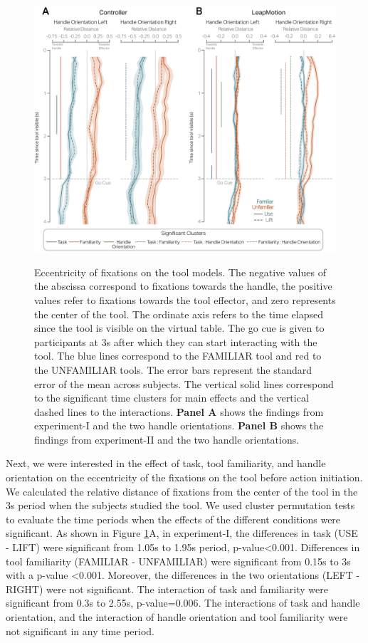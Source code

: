 \begin{figure}[ht]
    \centering
    \includegraphics[width=1\linewidth]{source/figures/result/dev_center_final.png} \\
    \caption[]{Eccentricity of fixations on the tool models. The negative values of the abscissa correspond to fixations towards the handle, the positive values refer to fixations towards the tool effector, and zero represents the center of the tool. The ordinate axis refers to the time elapsed since the tool is visible on the virtual table. The go cue is given to participants at 3s after which they can start interacting with the tool. The blue lines correspond to the FAMILIAR tool and red to the UNFAMILIAR tools. The error bars represent the standard error of the mean across subjects.  The vertical solid lines correspond to the significant time clusters for main effects and the vertical dashed lines to the interactions. \textbf{Panel A} shows the findings from experiment-I and the two handle orientations. \textbf{Panel B} shows the findings from experiment-II and the two handle orientations.
}
    \label{figure:dev_from_center}
\end{figure}

Next, we were interested in the effect of task, tool familiarity, and handle orientation on the eccentricity of the fixations on the tool before action initiation. We calculated the relative distance of fixations from the center of the tool in the 3s period when the subjects studied the tool. We used cluster permutation tests to evaluate the time periods when the effects of the different conditions were significant. As shown in Figure \ref{figure:dev_from_center}A, in experiment-I, the differences in task (USE - LIFT) were significant from 1.05s to 1.95s period, p-value<0.001. Differences in tool familiarity (FAMILIAR - UNFAMILIAR) were significant from 0.15s to 3s with a p-value <0.001. Moreover, the differences in the two orientations (LEFT - RIGHT) were not significant. The interaction of task and familiarity were significant from 0.3s to 2.55s, p-value=0.006. The interactions of task and handle orientation, and the interaction of handle orientation and tool familiarity were not significant in any time period.

